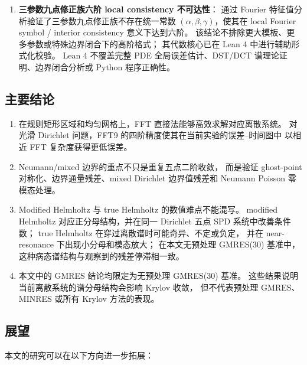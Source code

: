 \begin{enumerate}[itemsep=2pt]
  \item \textbf{三参数九点修正族六阶 local consistency 不可达性}：
        通过 Fourier 特征值分析验证了三参数九点修正族不存在统一常数
        $(\alpha,\beta,\gamma)$，使其在 local Fourier symbol / interior consistency
        意义下达到六阶。
        该结论不排除更大模板、更多参数或特殊边界闭合下的高阶格式；
        其代数核心已在 Lean 4 中进行辅助形式化校验。
        Lean 4 不覆盖完整 PDE 全局误差估计、DST/DCT 谱理论证明、边界闭合分析或 Python 程序正确性。
\end{enumerate}

\subsection{主要结论}

\begin{enumerate}[itemsep=2pt]
  \item 在规则矩形区域和均匀网格上，FFT 直接法能够高效求解对应离散系统。
        对光滑 Dirichlet 问题，FFT9 的四阶精度使其在当前实验的误差--时间图中
        以相近 FFT 复杂度获得更低误差。

  \item Neumann/mixed 边界的重点不只是重复五点二阶收敛，
        而是验证 ghost-point 对称化、边界通量残差、mixed Dirichlet 边界值残差和 Neumann Poisson 零模态处理。

  \item Modified Helmholtz 与 true Helmholtz 的数值难点不能混写。
        modified Helmholtz 对应正分母结构，并在同一 Dirichlet 五点 SPD 系统中改善条件数；
        true Helmholtz 在穿过离散谱时可能奇异、不定或负定，
        并在 near-resonance 下出现小分母和模态放大；
        在本文无预处理 GMRES(30) 基准中，这种病态谱结构与观察到的残差停滞相一致。

  \item 本文中的 GMRES 结论均限定为无预处理 GMRES(30) 基准。
        这些结果说明当前离散系统的谱分母结构会影响 Krylov 收敛，
        但不代表预处理 GMRES、MINRES 或所有 Krylov 方法的表现。
\end{enumerate}

\subsection{展望}

本文的研究可以在以下方向进一步拓展：

